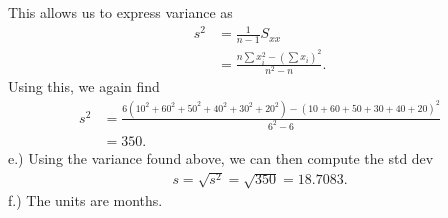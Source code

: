 \documentclass{report}
\begin{document}
    This allows us to express variance as
    \begin{align*}
        s^{2} &=\frac{1}{n-1}S_{xx} \\ 
        &=\frac{n\sum x_{i}^{2}- \left(\sum x_{i}\right)^{2}}{n^{2}-n}
    .\end{align*}
    \bigbreak \noindent 
    Using this, we again find
    \begin{align*}
        s^{2} &= \frac{6(10^{2} + 60^{2} + 50^{2} + 40^{2} + 30^{2} + 20^{2}) - (10 + 60 + 50 + 30 +40 + 20)^{2}}{6^{2}-6} \\
        &=350
    .\end{align*}
    \bigbreak \noindent 
    e.) Using the variance found above, we can then compute the std dev
    \begin{align*}
        s = \sqrt{s^{2}} = \sqrt{350} =18.7083
    .\end{align*}
    \bigbreak \noindent 
    f.) The units are months.
\end{document}
